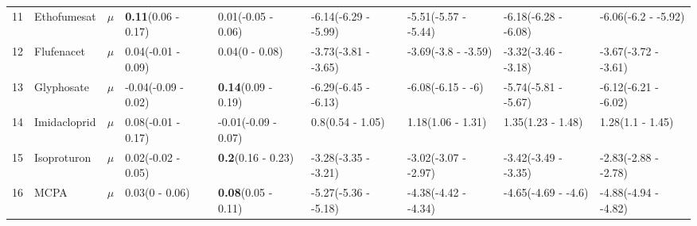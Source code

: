\begin{longtable}{lp{2cm}p{0.6cm}p{1.8cm}p{1.8cm}p{1.8cm}p{1.8cm}p{1.8cm}p{1.8cm}}
  11 & Ethofumesat & $\mu$ & \textbf{0.11}\newline (0.06 - 0.17) & 0.01\newline (-0.05 - 0.06) & -6.14\newline (-6.29 - -5.99) & -5.51\newline (-5.57 - -5.44) & -6.18\newline (-6.28 - -6.08) & -6.06\newline (-6.2 - -5.92) \\ 
  12 & Flufenacet & $\mu$ & 0.04\newline (-0.01 - 0.09) & 0.04\newline (0 - 0.08) & -3.73\newline (-3.81 - -3.65) & -3.69\newline (-3.8 - -3.59) & -3.32\newline (-3.46 - -3.18) & -3.67\newline (-3.72 - -3.61) \\ 
  13 & Glyphosate & $\mu$ & -0.04\newline (-0.09 - 0.02) & \textbf{0.14}\newline (0.09 - 0.19) & -6.29\newline (-6.45 - -6.13) & -6.08\newline (-6.15 - -6) & -5.74\newline (-5.81 - -5.67) & -6.12\newline (-6.21 - -6.02) \\ 
  14 & Imidacloprid & $\mu$ & 0.08\newline (-0.01 - 0.17) & -0.01\newline (-0.09 - 0.07) & 0.8\newline (0.54 - 1.05) & 1.18\newline (1.06 - 1.31) & 1.35\newline (1.23 - 1.48) & 1.28\newline (1.1 - 1.45) \\ 
  15 & Isoproturon & $\mu$ & 0.02\newline (-0.02 - 0.05) & \textbf{0.2}\newline (0.16 - 0.23) & -3.28\newline (-3.35 - -3.21) & -3.02\newline (-3.07 - -2.97) & -3.42\newline (-3.49 - -3.35) & -2.83\newline (-2.88 - -2.78) \\ 
  16 & MCPA & $\mu$ & 0.03\newline (0 - 0.06) & \textbf{0.08}\newline (0.05 - 0.11) & -5.27\newline (-5.36 - -5.18) & -4.38\newline (-4.42 - -4.34) & -4.65\newline (-4.69 - -4.6) & -4.88\newline (-4.94 - -4.82) \\ 

\end{longtable}
